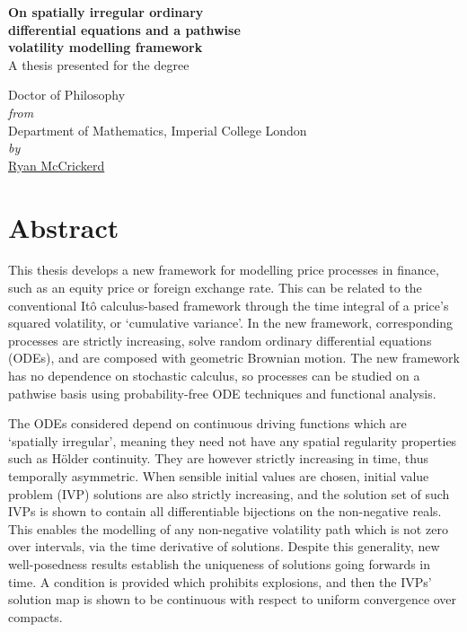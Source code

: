\setcounter{page}{1}

\begin{center}
    \vspace*{4mm}
    \LARGE \textbf{
    On spatially irregular ordinary\\
    differential equations and a pathwise\\
    volatility modelling framework\\
    }
    \vspace*{10mm}
    \large A thesis presented for the degree\\
    \vspace*{4mm}

    Doctor of Philosophy\\
    \emph{from}\\
    Department of Mathematics, Imperial College London\\
    \emph{by}\\
    \href{mailto:ryan.mccrickerd@gmail.com}{{\color{main}Ryan McCrickerd}}\,
\end{center}

\clearpage
\setlength{\parskip}{2mm}

\pagestyle{fancy}
\fancyhf{}
\renewcommand{\headrulewidth}{0pt}
\cfoot{\thepage}

\section*{\hypertarget{abstract}{Abstract}}

This thesis develops a new framework for modelling price processes in finance, such as an equity price or foreign exchange rate. This can be related to the conventional It\^o calculus-based framework through the time integral of a price's squared volatility, or `cumulative variance'. In the new framework, corresponding processes are strictly increasing, solve random ordinary differential equations (ODEs), and are composed with geometric Brownian motion. The new framework has no dependence on stochastic calculus, so processes can be studied on a pathwise basis using probability-free ODE techniques and functional analysis.

The ODEs considered depend on continuous driving functions which are `spatially irregular', meaning they need not have any spatial regularity properties such as H\"older continuity. They are however strictly increasing in time, thus temporally asymmetric. When sensible initial values are chosen, initial value problem (IVP) solutions are also strictly increasing, and the solution set of such IVPs is shown to contain all differentiable bijections on the non-negative reals. This enables the modelling of any non-negative volatility path which is not zero over intervals, via the time derivative of solutions. Despite this generality, new well-posedness results establish the uniqueness of solutions going forwards in time. A condition is provided which prohibits explosions, and then the IVPs' solution map is shown to be continuous with respect to uniform convergence over compacts.

